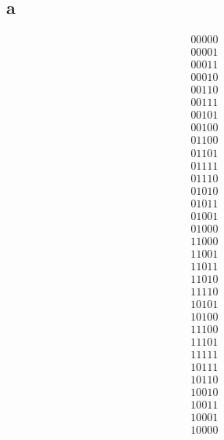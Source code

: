 \documentclass{article}
\begin{document}
\subsection*{a}
\begin{align*}
  00000\\
  00001\\
  00011\\
  00010\\
  00110\\
  00111\\
  00101\\
  00100\\
  01100\\
  01101\\
  01111\\
  01110\\
  01010\\
  01011\\
  01001\\
  01000\\
  11000\\
  11001\\
  11011\\
  11010\\
  11110\\
  10101\\
  10100\\
  11100\\
  11101\\
  11111\\
  10111\\
  10110\\
  10010\\
  10011\\
  10001\\
  10000
\end{align*}
\end{document}
